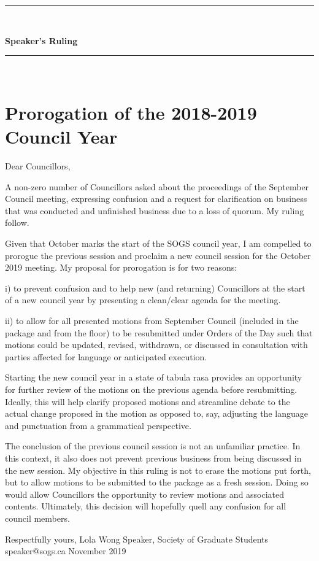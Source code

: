 \begin{center}
\rule{\textwidth}{3.6pt}\\[\baselineskip] %
\begin{Huge}
\textbf{Speaker's Ruling}
\end{Huge}

\rule{\textwidth}{3.6pt}\\[\baselineskip] %



\vspace*{2\baselineskip} %
\end{center}
\section*{Prorogation of the 2018-2019 Council Year}

Dear Councillors,

A non-zero number of Councillors asked about the proceedings of the September Council meeting, expressing confusion and a request for clarification on business that was conducted and unfinished business due to a loss of quorum. My ruling follow. 

	\begin{multicols}{2}
Given that October marks the start of the SOGS council year, I am compelled to prorogue the previous session and proclaim a new council session for the October 2019 meeting.
My proposal for prorogation is for two reasons:  

i) to prevent confusion and to help new (and returning) Councillors at the start of a new council year by presenting a clean/clear agenda for the meeting.

ii) to allow for all presented motions from September Council (included in the package and from the floor) to be resubmitted under Orders of the Day such that motions could be updated, revised, withdrawn, or discussed in consultation with parties affected for language or anticipated execution.

Starting the new council year in a state of tabula rasa provides an opportunity for further review of the motions on the previous agenda before resubmitting. Ideally, this will help clarify proposed motions and streamline debate to the actual change proposed in the motion as opposed to, say, adjusting the language and punctuation from a grammatical perspective.

The conclusion of the previous council session is not an unfamiliar practice. In this context, it also does not prevent previous business from being discussed in the new session. My objective in this ruling is not to erase the motions put forth, but to allow motions to be submitted to the package as a fresh session. Doing so would allow Councillors the opportunity to review motions and associated contents. Ultimately, this decision will hopefully quell any confusion for all council members.

\end{multicols}


\vskip 2cm
\noindent
Respectfully yours, \newline
\noindent
Lola Wong \newline
\indent
Speaker, \newline 
\indent
Society of Graduate Students \newline
\indent
speaker@sogs.ca \newline
\indent 
November 2019